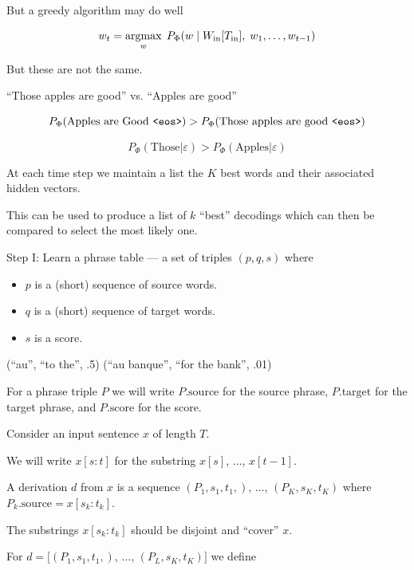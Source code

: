 {\vfill
But a greedy algorithm may do well

\vfill
$$w_t = \operatorname*{argmax}_w\; P_\Phi(w\;|\;W_{\mathrm{in}}[T_{\mathrm{in}}],\;w_1,\ldots,w_{t-1})$$

\vfill
But these are not the same.


``Those apples are good'' vs. ``Apples are good''

\vfill
$$P_\Phi(\mbox{Apples are Good {\tt <eos>}}) > P_\Phi(\mbox{Those apples are good {\tt <eos>}})$$

\vfill
$$P_\Phi(\mbox{Those}|\varepsilon) > P_\Phi(\mbox{Apples}|\varepsilon)$$
    

At each time step we maintain a list the $K$ best words and their associated hidden vectors.

\vfill
This can be used to produce a list of $k$ ``best'' decodings which can then be compared to select
the most likely one.


Step I:   Learn a phrase table --- a set of triples $(p,q,s)$ where

\vfill
\begin{itemize}
\item $p$ is a (short) sequence of source words.
  \vfill
\item $q$ is a (short) sequence of target words.
  \vfill
\item $s$ is a score.
\end{itemize}

\vfill
(``au'', ``to the'', .5) \hfill (``au banque'', ``for the bank'', .01)

\vfill
For a phrase triple $P$ we will write $P.\mathrm{source}$ for the source phrase, $P.\mathrm{target}$ for the target phrase, and $P.\mathrm{score}$ for the score.


Consider an input sentence $x$ of length $T$.

\vfill
We will write $x[s:t]$ for the substring $x[s]$, $\ldots$, $x[t-1]$.

\vfill
A derivation $d$ from $x$ is a sequence $(P_1,s_1,t_1,)$, $\ldots$, $(P_K,s_K,t_K)$ where $P_k.\mathrm{source} = x[s_k:t_k]$.

\vfill
The substrings $x[s_k:t_k]$ should be disjoint and ``cover'' $x$.

\vfill
For $d = [(P_1,s_1,t_1,)$, $\ldots$, $(P_L,s_K,t_K)]$ we define

}
